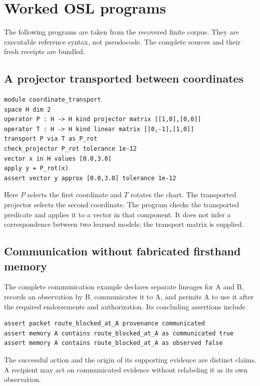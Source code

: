 \documentclass[11pt]{article}
\begin{document}
\section{Worked OSL programs}
The following programs are taken from the recovered finite corpus. They are executable reference syntax, not pseudocode. The complete sources and their fresh receipts are bundled. \cite{o05}

\subsection{A projector transported between coordinates}
\begin{lstlisting}
module coordinate_transport
space H dim 2
operator P : H -> H kind projector matrix [[1,0],[0,0]]
operator T : H -> H kind linear matrix [[0,-1],[1,0]]
transport P via T as P_rot
check_projector P_rot tolerance 1e-12
vector x in H values [0.0,3.0]
apply y = P_rot(x)
assert vector y approx [0.0,3.0] tolerance 1e-12
\end{lstlisting}
Here \(P\) selects the first coordinate and \(T\) rotates the chart. The transported projector selects the second coordinate. The program checks the transported predicate and applies it to a vector in that component. It does not infer a correspondence between two learned models; the transport matrix is supplied.

\subsection{Communication without fabricated firsthand memory}
The complete communication example declares separate lineages for A and B, records an observation by B, communicates it to A, and permits A to use it after the required endorsements and authorization. Its concluding assertions include
\begin{lstlisting}
assert packet route_blocked_at_A provenance communicated
assert memory A contains route_blocked_at_A as communicated true
assert memory A contains route_blocked_at_A as observed false
\end{lstlisting}
The successful action and the origin of its supporting evidence are distinct claims. A recipient may act on communicated evidence without relabeling it as its own observation.
\end{document}
